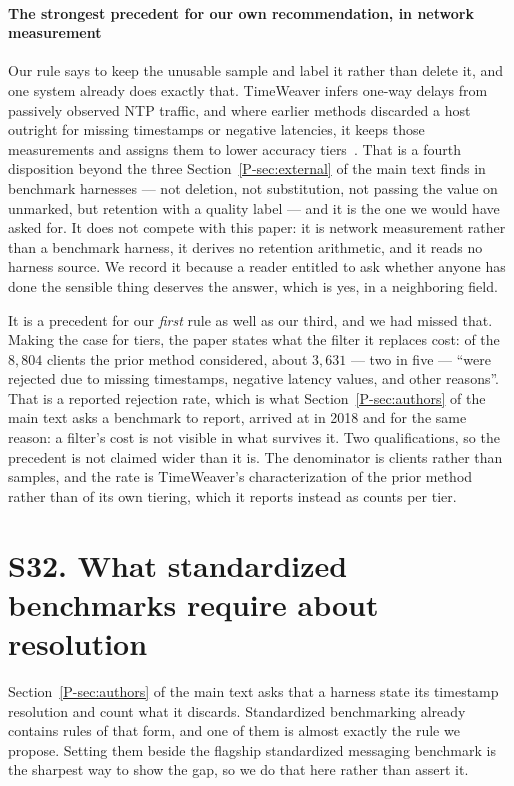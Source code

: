 \documentclass[10pt,journal,onecolumn]{IEEEtran}
\newcommand{\mainModeB}{\ref{P-sec:external}}              %
\newcommand{\mainAuthors}{\ref{P-sec:authors}}        %
\begin{document}
\paragraph{The strongest precedent for our own recommendation, in network measurement}
Our rule says to keep the unusable sample and label it rather than delete it, and one system
already does exactly that. TimeWeaver infers one-way delays from passively observed NTP
traffic, and where earlier methods discarded a host outright for missing timestamps or
negative latencies, it keeps those measurements and assigns them to lower accuracy
tiers~\cite{durairajan2018timeweaver}. That is a fourth disposition beyond the three
Section~\mainModeB{} of the main text finds in benchmark harnesses --- not deletion, not
substitution, not passing the value on unmarked, but retention with a quality label --- and
it is the one we would have asked for. It does not compete with this paper: it is network
measurement rather than a benchmark harness, it derives no retention arithmetic, and it
reads no harness source. We record it because a reader entitled to ask whether anyone has
done the sensible thing deserves the answer, which is yes, in a neighboring field.

It is a precedent for our \emph{first} rule as well as our third, and we had missed that.
Making the case for tiers, the paper states what the filter it replaces cost: of the $8{,}804$
clients the prior method considered, about $3{,}631$ --- two in five --- ``were rejected due to
missing timestamps, negative latency values, and other reasons''. That is a reported
rejection rate, which is what Section~\mainAuthors{} of the main text asks a benchmark to
report, arrived at in 2018 and for the same reason: a filter's cost is not visible in what
survives it. Two qualifications, so the precedent is not claimed wider than it is. The
denominator is clients rather than samples, and the rate is TimeWeaver's characterization of
the prior method rather than of its own tiering, which it reports instead as counts per tier.

\section{S32. What standardized benchmarks require about resolution}
\label{sec:standards}

Section~\mainAuthors{} of the main text asks that a harness state its timestamp resolution and count what it
discards. Standardized benchmarking already contains rules of that form, and one of them is
almost exactly the rule we propose. Setting them beside the flagship standardized messaging
benchmark is the sharpest way to show the gap, so we do that here rather than assert it.
\end{document}
